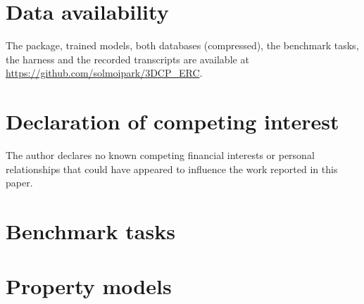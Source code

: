 \documentclass[preprint,12pt]{elsarticle}
\begin{document}
\section*{Data availability}
The package, trained models, both databases (compressed), the benchmark tasks, the harness and the recorded transcripts are available at \url{https://github.com/solmoipark/3DCP_ERC}.

\section*{Declaration of competing interest}
The author declares no known competing financial interests or personal relationships that could have appeared to influence the work reported in this paper.




\appendix
\section{Benchmark tasks}
\begin{table}[h]
\centering\scriptsize
\caption{Benchmark tasks with abridged prompts. Full prompts, checks and ground-truth values are provided in the released evaluation package. The checks column counts assertions on recorded tool arguments and identifies additional criteria.}
\resizebox{\textwidth}{!}{}
\end{table}

\section{Property models}
\begin{table}[h]
\centering\scriptsize
\caption{All property models with paper-grouped cross-validation quality ($R^2$ in log space, Spearman rank correlation, 80\,\% interval coverage) and training size.}
\resizebox{\textwidth}{!}{}
\end{table}
\end{document}
